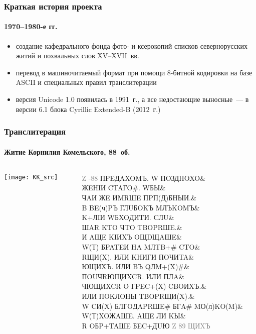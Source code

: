 \frame{\titlepage}

\begin{frame}
  \frametitle{Краткая история проекта}
  \framesubtitle{1970--1980-е гг.}

  \begin{block}{}
    \begin{itemize}
      \item<1-> создание кафедрального фонда фото- и ксерокопий списков севернорусских житий и похвальных слов XV--XVII~вв.\autocite{averina_alexeeva_gerd:1996}
      \item<2-> перевод в машиночитаемый формат при помощи 8-битной кодировки на базе ASCII и специальных правил транслитерации
      \item<3-> версия Unicode 1.0 появилась в 1991~г., а все недостающие выносные~--- в версии 6.1 блока Cyrillic Extended-B (2012~г.)
    \end{itemize}
  \end{block}
\end{frame}

\begin{frame}
  \frametitle{Транслитерация}
  \framesubtitle{Житие Корнилия Комельского, 88~об.}

  \begin{columns}[c]
    \begin{column}{6cm}
      \texttt{[image: KK\_src]}
    \end{column}

    \begin{column}{6cm} \ttfamily \footnotesize
      \textcolor{gray}{Z -88} ПPEДAXOMЪ. W ПOЗДHOXO\& \\
      ЖEHIИ CTAГO\#. WБЫ\& \\
      ЧAИ ЖE ИMRШE ПPП(Д)БHЫИ.\& \\
      B BE(ч)PЪ ГЛUБOKЪ MЛЪKOMЪ\& \\
      K+ЛIИ WБXOДИTИ. CЛU\& \\
      ШAR KTO ЧTO TBOPRШE.\& \\
      И AЩE KIИXЪ OЩDЩAШE\& \\
      W(Т) БPATEИ HA MЛTB+\# CTO\& \\
      RЩИ(X). ИЛИ KHИГИ ПOЧИTA\& \\
      ЮЩИXЪ. ИЛИ BЪ QЛM+(X)\#\& \\
      ПOUЧRЮЩИXCR. ИЛИ ПЛA\& \\
      ЧЮЩИXCR O ГPEC+(X) CBOИXЪ.\& \\
      ИЛИ ПOKЛOHЫ TBOPRЩИ(X).\& \\
      W CИ(X) БЛГOДAPRШE\# БГA\# MО(л)KO(M)\& \\
      W(Т)XOЖAШE. AЩE ЛИ KЫ\& \\
      R OБP+TAШE БEC+ДUЮ \textcolor{gray}{Z 89 ЩИXЪ}
    \end{column}
  \end{columns}
\end{frame}

